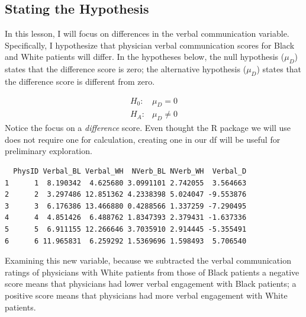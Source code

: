 \documentclass[
  11pt,
]{book}
\newenvironment{Shaded}{\begin{snugshade}}{\end{snugshade}}
\newcommand{\CommentTok}[1]{\textcolor[rgb]{0.56,0.35,0.01}{\textit{#1}}}
\newcommand{\FunctionTok}[1]{\textcolor[rgb]{0.00,0.00,0.00}{#1}}
\newcommand{\NormalTok}[1]{#1}
\newcommand{\OtherTok}[1]{\textcolor[rgb]{0.56,0.35,0.01}{#1}}
\newcommand{\SpecialCharTok}[1]{\textcolor[rgb]{0.00,0.00,0.00}{#1}}
\begin{document}
\hypertarget{stating-the-hypothesis-2}{%
\subsection{Stating the Hypothesis}\label{stating-the-hypothesis-2}}

In this lesson, I will focus on differences in the verbal communication variable. Specifically, I hypothesize that physician verbal communication scores for Black and White patients will differ. In the hypotheses below, the null hypothesis (\(\mu_D\)) states that the difference score is zero; the alternative hypothesis (\(\mu_D\)) states that the difference score is different from zero.

\[
\begin{array}{ll}
H_0: & \mu_D = 0  \\
H_A: & \mu_D \neq 0
\end{array}
\]
Notice the focus on a \emph{difference} score. Even thought the R package we will use does not require one for calculation, creating one in our df will be useful for preliminary exploration.

\begin{Shaded}
\end{Shaded}

\begin{verbatim}
  PhysID Verbal_BL Verbal_WH  NVerb_BL NVerb_WH  Verbal_D
1      1  8.190342  4.625680 3.0991101 2.742055  3.564663
2      2  3.297486 12.851362 4.2338398 5.024047 -9.553876
3      3  6.176386 13.466880 0.4288566 1.337259 -7.290495
4      4  4.851426  6.488762 1.8347393 2.379431 -1.637336
5      5  6.911155 12.266646 3.7035910 2.914445 -5.355491
6      6 11.965831  6.259292 1.5369696 1.598493  5.706540
\end{verbatim}

Examining this new variable, because we subtracted the verbal communication ratings of physicians with White patients from those of Black patients a negative score means that physicians had lower verbal engagement with Black patients; a positive score means that physicians had more verbal engagement with White patients.
\end{document}

